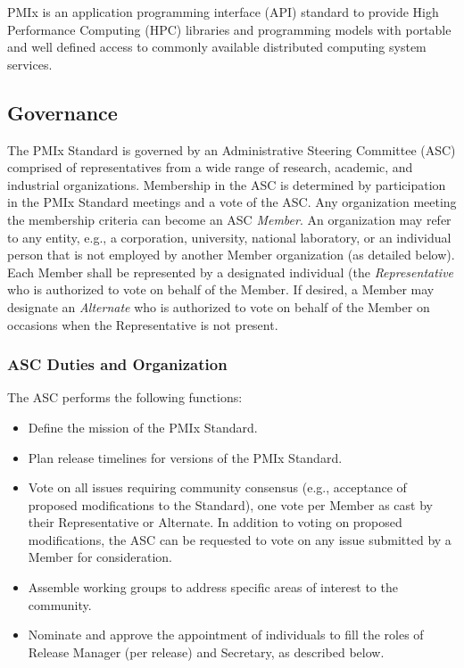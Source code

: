 \documentclass{article}
\providecommand{\tightlist}{%
  \setlength{\itemsep}{0pt}\setlength{\parskip}{0pt}}
\begin{document}
PMIx is an application programming interface (API) standard to provide
High Performance Computing (HPC) libraries and programming models with
portable and well defined access to commonly available distributed
computing system services.

\hypertarget{governance}{%
\subsection{Governance}%
\label{governance}}

The PMIx Standard is governed by an Administrative Steering Committee
(ASC) comprised of representatives from a wide range of research,
academic, and industrial organizations. Membership in the ASC is
determined by participation in the PMIx Standard meetings and a vote of
the ASC. Any organization meeting the membership criteria can become an
ASC \textit{Member}. An organization may refer to any entity, e.g., a
corporation, university, national laboratory, or an individual person
that is not employed by another Member organization (as detailed below).
Each Member shall be represented by a designated individual (the
\textit{Representative} who is authorized to vote on behalf of the Member.
If desired, a Member may designate an \textit{Alternate} who is authorized to
vote on behalf of the Member on occasions when the Representative is not
present.

\hypertarget{gov-asc-duties}{%
\subsubsection{ASC Duties and Organization}%
\label{gov-asc-duties}}

The ASC performs the following functions:

\begin{itemize}
\tightlist
\item
  Define the mission of the PMIx Standard.
\item
  Plan release timelines for versions of the PMIx Standard.
\item
  Vote on all issues requiring community consensus (e.g., acceptance of
  proposed modifications to the Standard), one vote per Member as cast
  by their Representative or Alternate. In addition to voting on
  proposed modifications, the ASC can be requested to vote on any issue
  submitted by a Member for consideration.
\item
  Assemble working groups to address specific areas of interest to the
  community.
\item
  Nominate and approve the appointment of individuals to fill the roles
  of Release Manager (per release) and Secretary, as described below.
\end{itemize}
\end{document}
